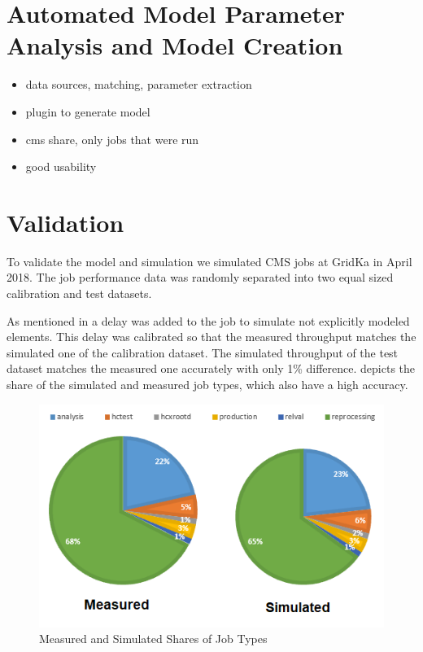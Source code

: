 \documentclass[a4paper]{jpconf}
\begin{document}
\section{Automated Model Parameter Analysis and Model Creation}
\label{sec:param}
\begin{itemize}
	\item data sources, matching, parameter extraction
	\item plugin to generate model
	\item cms share, only jobs that were run
	\item good usability
\end{itemize}

\section{Validation}
\label{validation}
To validate the model and simulation we simulated CMS jobs at GridKa in April 2018.
The job performance data was randomly separated into two equal sized calibration and test datasets.

As mentioned in  a delay was added to the job to simulate not explicitly modeled elements. This delay was calibrated so that the measured throughput matches the simulated one of the calibration dataset. The simulated throughput of the test dataset matches the measured one accurately with only 1\% difference.
 depicts the share of the simulated and measured job types, which also have a high accuracy.

\begin{figure}
	\centering
	\includegraphics[scale = 0.4]{images/shares}
	\caption[]{Measured and Simulated Shares of Job Types}
	\label{shares}
\end{figure}
\end{document}
